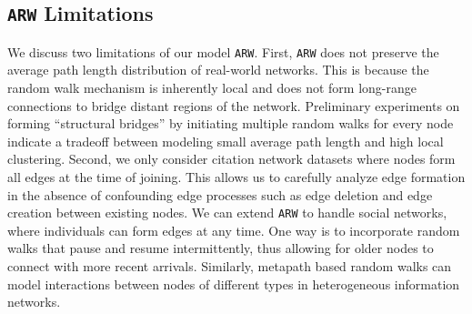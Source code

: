 \subsection{\texttt{ARW} Limitations}
We discuss two limitations of our model \texttt{ARW}. First, \texttt{ARW} does not preserve the average
path length distribution of real-world networks. This is because the random walk
mechanism is inherently local and does not form {long-range connections} to bridge
distant regions of the network. Preliminary experiments on forming ``structural bridges''
by initiating multiple random walks for every node indicate a tradeoff
between modeling small average path length and high local clustering. Second,
we only consider citation network datasets where nodes form all edges at the time of joining.
This allows us to carefully analyze edge formation in the absence of confounding edge processes
such as edge deletion and edge creation between existing nodes. We can extend \texttt{ARW} to handle social networks, where individuals can form edges at any time. One way is to incorporate random walks that pause and resume intermittently, thus allowing for older nodes to connect with more recent arrivals.
Similarly, metapath based random walks can model interactions between
nodes of different types in heterogeneous information networks.

%

